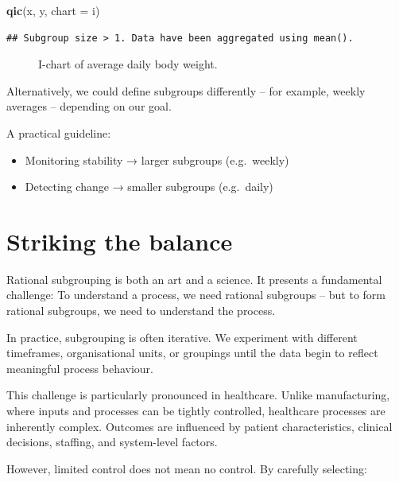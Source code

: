 \documentclass[
]{book}
\makeatletter
\newenvironment{Shaded}{\begin{snugshade}}{\end{snugshade}}
\newcommand{\AttributeTok}[1]{\textcolor[rgb]{0.13,0.29,0.53}{#1}}
\newcommand{\FunctionTok}[1]{\textcolor[rgb]{0.13,0.29,0.53}{\textbf{#1}}}
\newcommand{\NormalTok}[1]{#1}
\newcommand{\StringTok}[1]{\textcolor[rgb]{0.31,0.60,0.02}{#1}}
\newcommand*\pandocbounded[1]{%
  \sbox\pandoc@box{#1}%
  \Gscale@div\@tempa{\textheight}{\dimexpr\ht\pandoc@box+\dp\pandoc@box\relax}%
  \Gscale@div\@tempb{\linewidth}{\wd\pandoc@box}%
  \ifdim\@tempb\p@<\@tempa\p@\let\@tempa\@tempb\fi%
  \ifdim\@tempa\p@<\p@\scalebox{\@tempa}{\usebox\pandoc@box}%
  \else\usebox{\pandoc@box}%
  \fi%
}
\providecommand{\tightlist}{%
  \setlength{\itemsep}{0pt}\setlength{\parskip}{0pt}}
\makeatother
\begin{document}
\begin{Shaded}
\begin{Highlighting}[]
\FunctionTok{qic}\NormalTok{(x, y, }\AttributeTok{chart =} \StringTok{\textquotesingle{}i\textquotesingle{}}\NormalTok{)}
\end{Highlighting}
\end{Shaded}

\begin{verbatim}
## Subgroup size > 1. Data have been aggregated using mean().
\end{verbatim}

\begin{figure}
\centering
\pandocbounded{}
\caption{I-chart of average daily body weight.}
\end{figure}

Alternatively, we could define subgroups differently -- for example,
weekly averages -- depending on our goal.

A practical guideline:

\begin{itemize}
\tightlist
\item
  Monitoring stability → larger subgroups (e.g.~weekly)
\item
  Detecting change → smaller subgroups (e.g.~daily)
\end{itemize}

\section{Striking the balance}\label{striking-the-balance}

Rational subgrouping is both an art and a science. It presents a
fundamental challenge: To understand a process, we need rational
subgroups -- but to form rational subgroups, we need to understand the
process.

In practice, subgrouping is often iterative. We experiment with
different timeframes, organisational units, or groupings until the data
begin to reflect meaningful process behaviour.

This challenge is particularly pronounced in healthcare. Unlike
manufacturing, where inputs and processes can be tightly controlled,
healthcare processes are inherently complex. Outcomes are influenced by
patient characteristics, clinical decisions, staffing, and system-level
factors.

However, limited control does not mean no control. By carefully
selecting:
\end{document}

